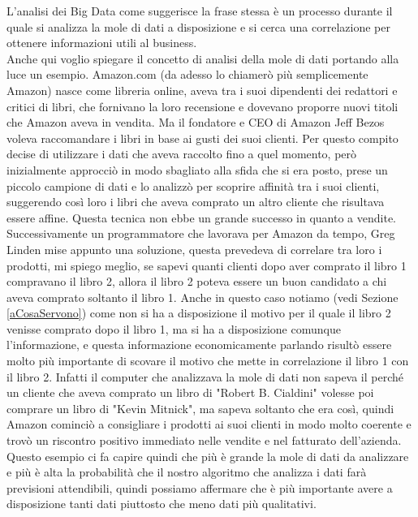 L'analisi dei Big Data come suggerisce la frase stessa \`e un processo durante il quale si analizza la mole di dati a disposizione e si cerca una correlazione per ottenere informazioni utili al business.\\
Anche qui voglio spiegare il concetto di analisi della mole di dati portando alla luce un esempio. Amazon.com (da adesso lo chiamer\`o pi\`u semplicemente Amazon) nasce come libreria online, aveva tra i suoi dipendenti dei redattori e critici di libri, che fornivano la loro recensione e dovevano proporre nuovi titoli che Amazon aveva in vendita. Ma il fondatore e CEO di Amazon Jeff Bezos voleva raccomandare i libri in base ai gusti dei suoi clienti. Per questo compito decise di utilizzare i dati che aveva raccolto fino a quel momento, per\`o inizialmente approcci\`o in modo sbagliato alla sfida che si era posto, prese un piccolo campione di dati e lo analizz\`o per scoprire affinit\`a tra i suoi clienti, suggerendo cos\`i loro i libri che aveva comprato un altro cliente che risultava essere affine. Questa tecnica non ebbe un grande successo in quanto a vendite. Successivamente un programmatore che lavorava per Amazon da tempo, Greg Linden mise appunto una soluzione, questa prevedeva di correlare tra loro i prodotti, mi spiego meglio, se sapevi quanti clienti dopo aver comprato il libro 1 compravano il libro 2, allora il libro 2 poteva essere un buon candidato a chi aveva comprato soltanto il libro 1. Anche in questo caso notiamo (vedi Sezione \ref{aCosaServono}) come non si ha a disposizione il motivo per il quale il libro 2 venisse comprato dopo il libro 1, ma si ha a disposizione comunque l'informazione, e questa informazione economicamente parlando risult\`o essere molto pi\`u importante di scovare il motivo che mette in correlazione il libro 1 con il libro 2. Infatti il computer che analizzava la mole di dati non sapeva il perch\'e un cliente che aveva comprato un libro di "Robert B. Cialdini" volesse poi comprare un libro di "Kevin Mitnick", ma sapeva soltanto che era cos\`i, quindi Amazon cominci\`o a consigliare i prodotti ai suoi clienti in modo molto coerente e trov\`o un riscontro positivo immediato nelle vendite e nel fatturato dell'azienda.\\
Questo esempio ci fa capire quindi che pi\`u \`e grande la mole di dati da analizzare e pi\`u \`e alta la probabilit\`a che il nostro algoritmo che analizza i dati far\`a previsioni attendibili, quindi possiamo affermare che \`e pi\`u importante avere a disposizione tanti dati piuttosto che meno dati pi\`u qualitativi. \cite{bigData}

